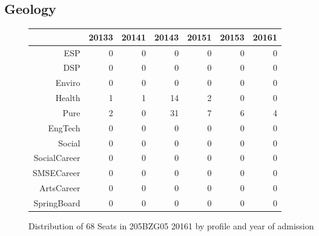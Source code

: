 \documentclass{article}\usepackage[]{graphicx}\usepackage[]{color}
\begin{document}
\subsection{Geology}
\begin{figure}[H]
\centering
\begin{tabular}{rrrrrrr}
  \hline
 & 20133 & 20141 & 20143 & 20151 & 20153 & 20161 \\ 
  \hline
ESP &   0 &   0 &   0 &   0 &   0 &   0 \\ 
  DSP &   0 &   0 &   0 &   0 &   0 &   0 \\ 
  Enviro &   0 &   0 &   0 &   0 &   0 &   0 \\ 
  Health &   1 &   1 &  14 &   2 &   0 &   0 \\ 
  Pure &   2 &   0 &  31 &   7 &   6 &   4 \\ 
  EngTech &   0 &   0 &   0 &   0 &   0 &   0 \\ 
  Social &   0 &   0 &   0 &   0 &   0 &   0 \\ 
  SocialCareer &   0 &   0 &   0 &   0 &   0 &   0 \\ 
  SMSECareer &   0 &   0 &   0 &   0 &   0 &   0 \\ 
  ArtsCareer &   0 &   0 &   0 &   0 &   0 &   0 \\ 
  SpringBoard &   0 &   0 &   0 &   0 &   0 &   0 \\ 
   \hline
\end{tabular}
\caption{Distribution of 68 Seats in 205BZG05 20161 by profile and year of admission} 
\end{figure}
\end{document}
